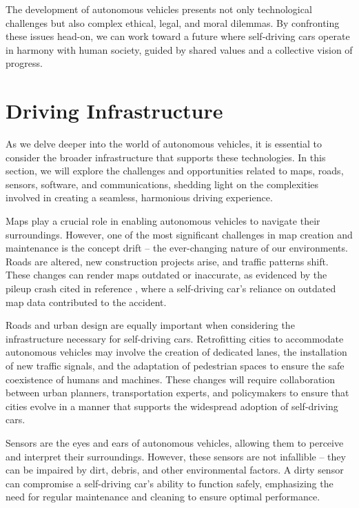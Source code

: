 The development of autonomous vehicles presents not only technological challenges but also complex ethical, legal, and moral dilemmas. By confronting these issues head-on, we can work toward a future where self-driving cars operate in harmony with human society, guided by shared values and a collective vision of progress.

\section{Driving Infrastructure}

As we delve deeper into the world of autonomous vehicles, it is essential to consider the broader infrastructure that supports these technologies. In this section, we will explore the challenges and opportunities related to maps, roads, sensors, software, and communications, shedding light on the complexities involved in creating a seamless, harmonious driving experience.

Maps play a crucial role in enabling autonomous vehicles to navigate their surroundings. However, one of the most significant challenges in map creation and maintenance is the concept drift – the ever-changing nature of our environments. Roads are altered, new construction projects arise, and traffic patterns shift. These changes can render maps outdated or inaccurate, as evidenced by the pileup crash cited in reference , where a self-driving car's reliance on outdated map data contributed to the accident.

Roads and urban design are equally important when considering the infrastructure necessary for self-driving cars. Retrofitting cities to accommodate autonomous vehicles may involve the creation of dedicated lanes, the installation of new traffic signals, and the adaptation of pedestrian spaces to ensure the safe coexistence of humans and machines. These changes will require collaboration between urban planners, transportation experts, and policymakers to ensure that cities evolve in a manner that supports the widespread adoption of self-driving cars.

Sensors are the eyes and ears of autonomous vehicles, allowing them to perceive and interpret their surroundings. However, these sensors are not infallible – they can be impaired by dirt, debris, and other environmental factors. A dirty sensor can compromise a self-driving car's ability to function safely, emphasizing the need for regular maintenance and cleaning to ensure optimal performance.

